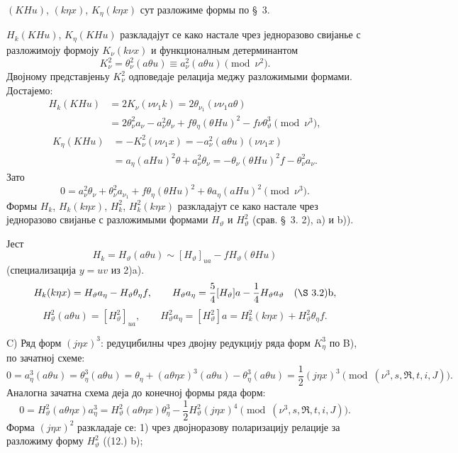 ﻿\documentclass[11pt]{article}
\newcommand{\R}{\mathfrak R}
\begin{document}
$(KHu)$, $(k\eta x)$, $K_\eta(k\eta x)$ сут разложиме формы по \S\ 3.

$H_k(KHu)$, $K_\eta(KHu)$ разкладајут се како настале чрез једноразово свијанье с разложимоју формоју $K_\nu(k\nu x)$ и функционалным детерминантом
\[
K_\nu^2=\theta_\nu^2(a\theta u)\equiv a_\nu^2(a\theta u)\pmod{\nu^2}.
\]
Двојному представјеньу $K_\nu^2$ одповедаје релација меджу разложимыми формами. Достајемо:
\[
\begin{aligned}
H_k(KHu)&=2K_\nu(\nu\nu_1k)=2\theta_{\nu_1}(\nu\nu_1a\theta)\\
&=2\theta_\nu^2a_\nu-a_\nu^2\theta_\nu
+f\theta_\eta(\theta Hu)^2-f\nu\theta_\vartheta^3
\pmod{\nu^3},
\end{aligned}
\]
\[
\begin{aligned}
K_\eta(KHu)&=-K_\nu^2(\nu\nu_1x)
=-a_\nu^2(a\theta u)(\nu\nu_1x)\\
&=a_\eta(aHu)^2\theta+a_\nu^2\theta_\nu
=-\theta_\nu(\theta Hu)^2f-\theta_\nu^2a_\nu.
\end{aligned}
\]
Зато
\[
\tag{17}
0=a_\nu^2\theta_\nu+\theta_\nu^2a_{\nu_1}
+f\theta_\eta(\theta Hu)^2+\theta a_\eta(aHu)^2\pmod{\nu^3}.
\]
Формы $H_k$, $H_k(k\eta x)$, $H_k^2$, $H_k^2(k\eta x)$ разкладајут се како настале чрез једноразово свијанье с разложимыми формами $H_\vartheta$ и $H_\vartheta^2$ (срав. \S\ 3. 2), \mbox{a)} и \mbox{b)}).

Јест
\[
H_k=H_\vartheta(a\theta u)\sim [H_\vartheta]_{ua}-fH_\vartheta(\theta Hu)
\]
(специализација $y=uv$ из 2)\mbox{a}).
\[
H_k(k\eta x)=H_\vartheta a_\eta-H_\vartheta\theta_\eta f,
\qquad
H_\vartheta a_\eta=\frac54[H_\vartheta]a-\frac14H_\vartheta a_\vartheta
\quad(\S\ 3. 2)\mbox{b},
\]
\[
H_\vartheta^2(a\theta u)=[H_\vartheta^2]_{ua},
\qquad
H_\vartheta^2a_\eta=[H_\vartheta^2]a=H_k^2(k\eta x)+H_\vartheta^2\theta_\eta f.
\]

\noindent\mbox{C)} Ряд форм $(j\eta x)^3$: редуцибилны чрез двојну редукцију ряда форм $K_\eta^3$ по \mbox{B)}, по зачатној схеме:
\[
0=a_\eta^3(a\theta u)=\theta_\eta^3(a\theta u)
=\theta_\eta+(a\theta\eta x)^3(a\theta u)-\theta_\eta^3(a\theta u)
=\frac12(j\eta x)^3\pmod{(\nu^3,s,\R,t,i,J)}.
\]
Аналогна зачатна схема деја до конечној формы ряда форм:
\[
0=H_\vartheta^2(a\theta\eta x)a_\eta^3
=H_\vartheta^2(a\theta\eta x)\theta_\eta^3
-\frac12H_\vartheta^2(j\eta x)^4\pmod{(\nu^3,s,\R,t,i,J)}.
\]
Форма $(j\eta x)^2$ разкладаје се: 1) чрез двојноразову поларизацију релације за разложиму форму $H_\vartheta^2$ ((12.) \mbox{b});
\end{document}
